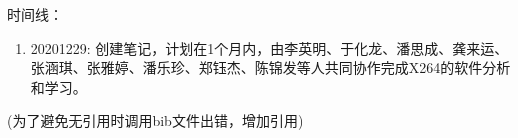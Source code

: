\begin{preface}

时间线：

\begin{enumerate}
  \item 20201229: 创建笔记，计划在1个月内，由李英明、于化龙、潘思成、龚来运、张涵琪、张雅婷、潘乐珍、郑钰杰、陈锦发等人共同协作完成X264的软件分析和学习。
\end{enumerate}

(为了避免无引用时调用bib文件出错，增加引用\cite{HEVC_TCSVT2012_gjSullivan})

\end{preface}
